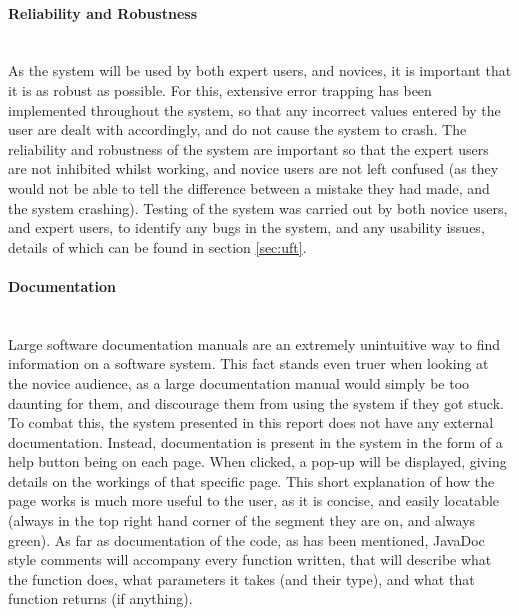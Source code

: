 \paragraph{Reliability and Robustness}\ \\
As the system will be used by both expert users, and novices, it is important that it is as robust as possible. For this, extensive error trapping has been implemented throughout the system, so that any incorrect values entered by the user are dealt with accordingly, and do not cause the system to crash. The reliability and robustness of the system are important so that the expert users are not inhibited whilst working, and novice users are not left confused (as they would not be able to tell the difference between a mistake they had made, and the system crashing). Testing of the system was carried out by both novice users, and expert users, to identify any bugs in the system, and any usability issues, details of which can be found in section \ref{sec:uft}.

\paragraph{Documentation}\ \\
Large software documentation manuals are an extremely unintuitive way to find information on a software system. This fact stands even truer when looking at the novice audience, as a large documentation manual would simply be too daunting for them, and discourage them from using the system if they got stuck. To combat this, the system presented in this report does not have any external documentation. Instead, documentation is present in the system in the form of a help button being on each page. When clicked, a pop-up will be displayed, giving details on the workings of that specific page. This short explanation of how the page works is much more useful to the user, as it is concise, and easily locatable (always in the top right hand corner of the segment they are on, and always green). As far as documentation of the code, as has been mentioned, JavaDoc style comments will accompany every function written, that will describe what the function does, what parameters it takes (and their type), and what that function returns (if anything). 

